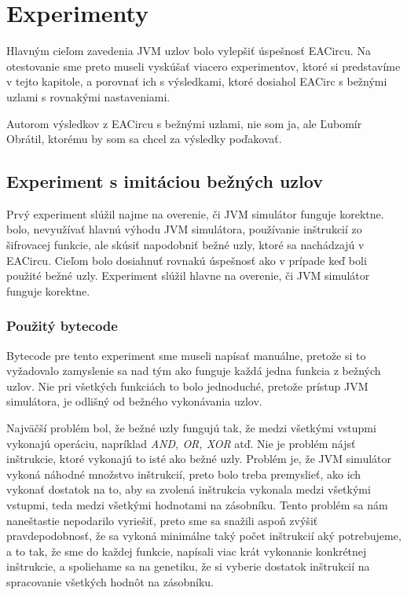 \chapter{Experimenty}
\label{chap:experiments}

Hlavným cieľom zavedenia JVM uzlov bolo vylepšiť úspešnosť EACircu. Na otestovanie sme preto museli vyskúšať viacero experimentov, ktoré si predstavíme v tejto kapitole, a porovnať ich s výsledkami, ktoré dosiahol EACirc s bežnými uzlami s rovnakými nastaveniami. 

Autorom výsledkov z EACircu s bežnými uzlami, nie som ja, ale Ľubomír Obrátil, ktorému by som sa chcel za výsledky poďakovať.

\section{Experiment s imitáciou bežných uzlov}
\label{sec:exp1}

Prvý experiment slúžil najme na overenie, či JVM simulátor funguje korektne.  bolo, nevyužívať hlavnú výhodu JVM simulátora, používanie inštrukcií zo šifrovacej funkcie, ale skúsiť napodobniť bežné uzly, ktoré sa nachádzajú v EACircu. Cieľom bolo dosiahnuť rovnakú úspešnosť ako v prípade keď boli použité bežné uzly. Experiment slúžil hlavne na overenie, či JVM simulátor funguje korektne.

\subsection{Použitý bytecode}
\label{subsec:exp1-bytecode}

Bytecode pre tento experiment sme museli napísať manuálne, pretože si to vyžadovalo zamyslenie sa nad tým ako funguje každá jedna funkcia z bežných uzlov. Nie pri všetkých funkciách to bolo jednoduché, pretože prístup JVM simulátora, je odlišný od bežného vykonávania uzlov. 

Najväčší problém bol, že bežné uzly fungujú tak, že medzi všetkými vstupmi vykonajú operáciu, napríklad \textit{AND, OR, XOR} atď. Nie je problém nájsť inštrukcie, ktoré vykonajú to isté ako bežné uzly. Problém je, že JVM simulátor vykoná náhodné množstvo inštrukcií, preto bolo treba premyslieť, ako ich vykonať dostatok na to, aby sa zvolená inštrukcia vykonala medzi všetkými vstupmi, teda medzi všetkými hodnotami na zásobníku. Tento problém sa nám naneštastie nepodarilo vyriešiť, preto sme sa snažili aspoň zvýšiť pravdepodobnosť, že sa vykoná minimálne taký počet inštrukcií aký potrebujeme, a to tak, že sme do každej funkcie, napísali viac krát vykonanie konkrétnej inštrukcie, a spoliehame sa na genetiku, že si vyberie dostatok inštrukcií na spracovanie všetkých hodnôt na zásobníku.

